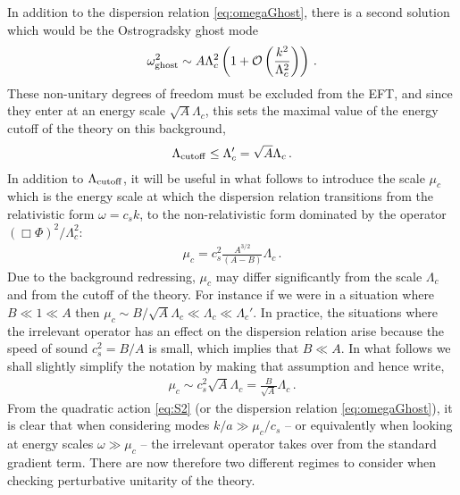 \documentclass[12pt]{article}
\def\ba{\begin{eqnarray}}
\def\ea{\end{eqnarray}}
\def\({\left(}
\def\){\right)}
\begin{document}
In addition to the dispersion relation \eqref{eq:omegaGhost}, there is a second solution which would be the Ostrogradsky ghost mode
\ba
\omega_{\rm ghost}^2 \sim A \Lambda_c^2 \(1+\mathcal{O}\(\frac{k^2}{\Lambda_c^2}\)\)\,.
\ea
These non-unitary degrees of freedom must be excluded from the EFT, and since they enter at an energy scale $\sqrt{A}\Lambda_c$, this sets the maximal value of the energy cutoff of the theory on this background,
\ba
\Lambda_{\rm cutoff} \le  \Lambda_c'=\sqrt{A}\Lambda_c\,.
\ea
In addition to $\Lambda_{\rm cutoff}$, it will be useful in what follows to introduce the scale $\mu_c$ which is the energy scale at which the dispersion relation transitions from the relativistic form $\omega = c_s k$, to the non-relativistic form dominated by the operator $(\Box \Phi)^2/\Lambda_c^2$:
\ba
\label{eq:mucFull}
\mu_c=c_s^2 \frac{A^{3/2}}{(A-B)} \Lambda_c\,.
\ea
Due to the background redressing,  $\mu_c$ may differ significantly from the scale $\Lambda_c$ and from the cutoff of the theory. For instance if we were in a situation where $B \ll 1\ll A$ then $\mu_c\sim B/\sqrt{A} \Lambda_c\ll \Lambda_c \ll \Lambda_{c}'$.    In practice, the situations where the irrelevant operator has an effect on the dispersion relation arise because the speed of sound $c_s^2=B/A$ is small, which implies that $B\ll A$. In what follows we shall slightly simplify the notation by making that assumption and hence write,
\ba
\label{eq:mucSimp}
\mu_c \sim c_s^2 \sqrt{A} \Lambda_c = \frac{B}{\sqrt{A}} \Lambda_c\,.
\ea
From the quadratic action \eqref{eq:S2} (or the dispersion relation \eqref{eq:omegaGhost}), it is clear that when considering modes $k/a \gg \mu_c/c_s$ -- or equivalently when looking at energy scales $\omega \gg \mu_c$ -- the irrelevant operator takes over from the standard gradient term. There are now therefore two different regimes to consider when checking perturbative unitarity of the theory.
\end{document}
